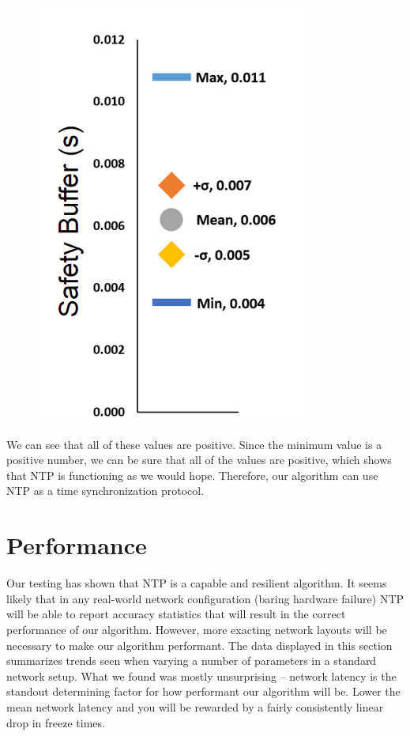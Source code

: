 \begin{figure}[h]
  \caption{}
  \label{fig:safety-data}
  \centering
  \includegraphics[width=0.8\textwidth]{safety-data.png}
\end{figure}

We can see that all of these values are positive. Since the minimum
value is a positive number, we can be sure that all of the values are
positive, which shows that NTP is functioning as we would
hope. Therefore, our algorithm can use NTP as a time synchronization
protocol.

\section{Performance}

Our testing has shown that NTP is a capable and resilient
algorithm. It seems likely that in any real-world network
configuration (baring hardware failure) NTP will be able to report
accuracy statistics that will result in the correct performance of our
algorithm. However, more exacting network layouts will be necessary to
make our algorithm performant. The data displayed in this section
summarizes trends seen when varying a number of parameters in a
standard network setup. What we found was mostly unsurprising --
network latency is the standout determining factor for how performant
our algorithm will be. Lower the mean network latency and you will be
rewarded by a fairly consistently linear drop in freeze times.

